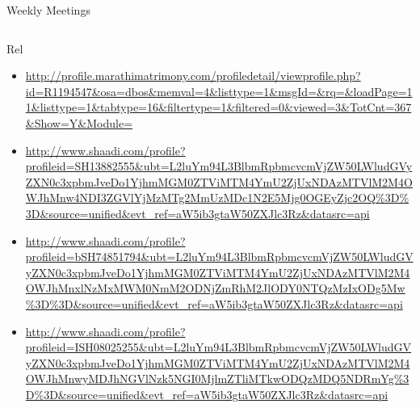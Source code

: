 \documentclass[serif, mathserif, final]{beamer}
\newcommand{\comments}[1]{}
\begin{document}
\begin{frame}
\begin{columns}
\begin{column}{0.5\linewidth}
\begin{block}{Weekly Meetings}
\begin{column}{0.25\linewidth}
\begin{block}{Rel}
\begin{itemize}
\item \small \url{http://profile.marathimatrimony.com/profiledetail/viewprofile.php?id=R1194547&osa=dbos&memval=4&listtype=1&msgId=&rq=&loadPage=11&listtype=1&tabtype=16&filtertype=1&filtered=0&viewed=3&TotCnt=367&Show=Y&Module=}

\item \small \url{http://www.shaadi.com/profile?profileid=SH13882555&ubt=L2luYm94L3BlbmRpbmcvcmVjZW50LWludGVyZXN0c3xpbmJveDo1YjhmMGM0ZTViMTM4YmU2ZjUxNDAzMTVlM2M4OWJhMnw4NDI3ZGVlYjMzMTg2MmUzMDc1N2E5Mjg0OGEyZjc2OQ\%3D\%3D&source=unified&evt_ref=aW5ib3gtaW50ZXJlc3Rz&datasrc=api}

\item \small \url{http://www.shaadi.com/profile?profileid=bSH74851794&ubt=L2luYm94L3BlbmRpbmcvcmVjZW50LWludGVyZXN0c3xpbmJveDo1YjhmMGM0ZTViMTM4YmU2ZjUxNDAzMTVlM2M4OWJhMnxlNzMxMWM0NmM2ODNjZmRhM2JlODY0NTQzMzIxODg5Mw\%3D\%3D&source=unified\&evt_ref=aW5ib3gtaW50ZXJlc3Rz&datasrc=api}

\item \small
  \url{http://www.shaadi.com/profile?profileid=ISH08025255&ubt=L2luYm94L3BlbmRpbmcvcmVjZW50LWludGVyZXN0c3xpbmJveDo1YjhmMGM0ZTViMTM4YmU2ZjUxNDAzMTVlM2M4OWJhMnwyMDJhNGVlNzk5NGI0MjlmZTliMTkwODQzMDQ5NDRmYg\%3D\%3D&source=unified&evt_ref=aW5ib3gtaW50ZXJlc3Rz&datasrc=api}
\end{itemize} 


\end{block} 
\end{column}%


\comments{
      \begin{block}{Week Daily Schedule} 
        \begin{columns} 
          \column{0.14\textwidth}{\textbf{\small \underline{Mon}}}
          \textbf{\small todo} \\ 
          \begin{itemize}
            \tiny \item \tiny Add in schedule
          \item \tiny 
          \end{itemize} 
          \textbf{\small schedule} \\
          \begin{enumerate} 
            \tiny \item \tiny 8-9AM: Regular Routines 
          \end{enumerate} 
          

\end{columns}
\end{block}}
\end{block}
\end{column}
\end{columns}
\end{frame}
\end{document}
